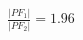 \documentclass[preview]{standalone}
\begin{document}
\begin{align*}
\frac{|PF_1|}{|PF_2|} = 1.96
\end{align*}
\end{document}

